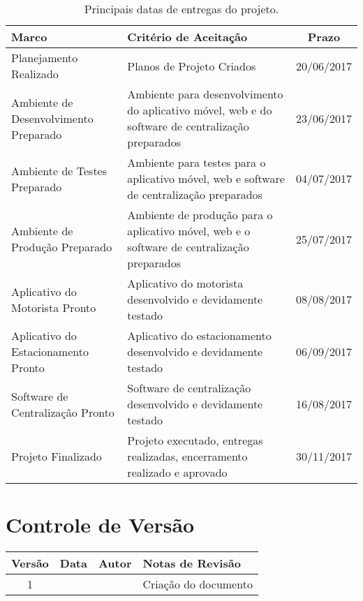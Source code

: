 \begin{table}[h]
	\begin{tabularx}{.9\textwidth}{| X | X | c |}
		\hline
		\textbf{Marco}                               & \textbf{Critério de Aceitação}                     & \textbf{Prazo} \\
		\hline
		Planejamento Realizado & Planos de Projeto Criados & 20/06/2017 \\
		\hline
		Ambiente de Desenvolvimento Preparado & Ambiente para desenvolvimento do aplicativo móvel, web e do software de centralização preparados & 23/06/2017 \\
		\hline
		Ambiente de Testes Preparado & Ambiente para testes para o aplicativo móvel, web e software de centralização preparados & 04/07/2017 \\
		\hline
		Ambiente de Produção Preparado & Ambiente de produção para o aplicativo móvel, web e o software de centralização preparados & 25/07/2017 \\
		\hline
		Aplicativo do Motorista Pronto & Aplicativo do motorista desenvolvido e devidamente testado & 08/08/2017 \\
		\hline
		Aplicativo do Estacionamento Pronto & Aplicativo do estacionamento desenvolvido e devidamente testado & 06/09/2017 \\
		\hline
		Software de Centralização Pronto & Software de centralização desenvolvido e devidamente testado & 16/08/2017 \\
		\hline
		Projeto Finalizado & Projeto executado, entregas realizadas, encerramento realizado e aprovado & 30/11/2017 \\
		\hline
	\end{tabularx}
	\centering
	\caption{Principais datas de entregas do projeto.}
	\label{tab:entregas}
\end{table}

\section{Controle de Versão}

\begin{table}[H]
	\begin{tabularx}{\textwidth}{| c | c | X | X |}
		\hline
		\textbf{Versão} & \textbf{Data} & \textbf{Autor}      & \textbf{Notas de Revisão} \\
		\hline
		1                &               & \projectManagerName{} & Criação do documento     \\
		\hline
	\end{tabularx}
	\centering
\end{table}

